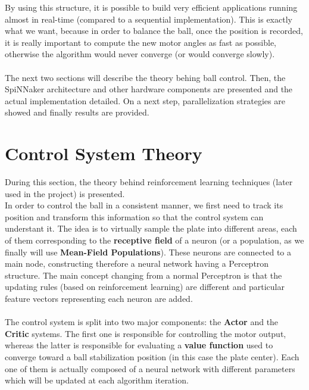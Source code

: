 \documentclass{article}
\begin{document}
By using this structure, it is possible to build very efficient applications running almost in real-time (compared to a sequential implementation). This is exactly what we want, because in order to balance the ball, once the position is recorded, it is really important to compute the new motor angles as fast as possible, otherwise the algorithm would never converge (or would converge slowly). \\ \\

The next two sections will describe the theory behing ball control. Then, the SpiNNaker architecture and other hardware components are presented and the actual implementation detailed. On a next step, parallelization strategies are showed and finally results are provided.


\section{Control System Theory}
During this section, the theory behind reinforcement learning techniques (later used in the project) is presented.\\

In order to control the ball in a consistent manner, we first need to track its position and transform this information so that the control system can understant it.
The idea is to virtually sample the plate into different areas, each of them corresponding to the \textbf{receptive field} of a neuron (or a population, as we finally will use \textbf{Mean-Field Populations}). These neurons are connected to a main node, constructing therefore a neural network having a Perceptron structure. The main concept changing from a normal Perceptron is that the updating rules (based on reinforcement learning) are different and particular feature vectors representing each neuron are added. \\ \\

The control system is split into two major components: the \textbf{Actor} and the \textbf{Critic} systems. The first one is responsible for controlling the motor output, whereas the latter is responsible for evaluating a \textbf{value function} used to converge toward a ball stabilization position (in this case the plate center). Each one of them is actually composed of a neural network with different parameters which will be updated at each algorithm iteration. \\ \\
\end{document}
